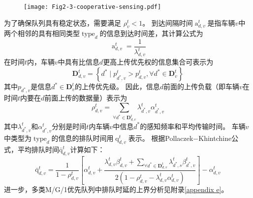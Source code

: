 \begin{figure}[h]
\centering
  \texttt{[image: Fig2-3-cooperative-sensing.pdf]}
  \label{fig 2-3}
\end{figure}

为了确保队列具有稳定状态，需要满足 $\rho_{v}^{t} < 1$。
到达间隔时间$\operatorname{a}_{d, v}^t$是指车辆$v$中两个相邻的具有相同类型$\operatorname{type}_d$的信息到达时间差，其计算公式为  
\begin{equation}
    \operatorname{a}_{d, v}^t=\frac{1}{\lambda_{d, v}^{t}}
\end{equation}
在时间$t$内，车辆$v$中具有比信息$d$更高上传优先权的信息集合可表示为
\begin{equation}
\mathbf{D}_{d, v}^t=\left\{d^* \mid p_{d^*, v}^t>p_{d, v}^t, \forall d^* \in \mathbf{D}_v^t\right\} 
\end{equation}
其中$p_{d^*, v}$是信息$d^* \in \mathbf{D}_v^t$的上传优先级。
  因此，信息$d$前面的上传负载（即车辆$v$在时间$t$内要在$d$前面上传的数据量）表示为
\begin{equation}
\rho_{d, v}^t=\sum_{\forall d^* \in \mathbf{D}_{d, v}^t} \lambda_{d^*, v}^t \alpha_{d^*, v}^t
\end{equation}
其中$\lambda_{d^*, v}^t$和$\alpha_{d^*, v}^t$分别是时间$t$内车辆$v$中信息$d^*$的感知频率和平均传输时间。
车辆$v$中类型为$\operatorname{type}_d$的信息的排队时间用$\operatorname{q}_{d, v}^t$表示。
根据Pollaczek$-$Khintchine公式\cite{takine2001queue}，平均排队时间$\operatorname{\bar{q}}_{d, v}^t$计算如下：
\begin{equation}
    \operatorname{\bar{q}}_{d, v}^t= \frac{1} {1 - \rho_{d, v}^{t}} 
        \left[ \alpha_{d, v}^t + \frac{ \lambda_{d, v}^{t} \beta_{d, v}^t + \sum\limits_{\forall d^* \in \mathbf{D}_{d, v}^t} \lambda_{d^*,s}^t \beta_{d^*, v}^t }{2\left(1-\rho_{d, v}^{t} - \lambda_{d, v}^{t}  \alpha_{d, v}^t\right)}\right] 
        - \alpha_{d, v}^t
\label{equ 2-6}
\end{equation}
进一步，多类M/G/1优先队列中排队时延的上界分析见附录\ref{appendix e}。

